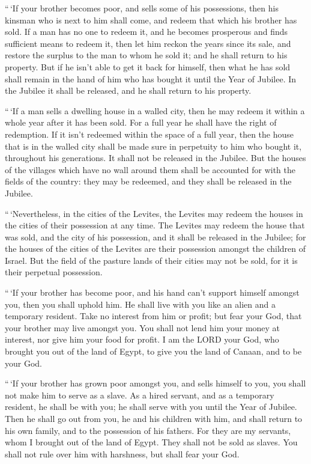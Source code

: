  ``\,`If your brother becomes poor, and sells some of his
possessions, then his kinsman who is next to him shall come, and redeem
that which his brother has sold.  If a man has no one to
redeem it, and he becomes prosperous and finds sufficient means to
redeem it,  then let him reckon the years since its sale,
and restore the surplus to the man to whom he sold it; and he shall
return to his property.  But if he isn't able to get it
back for himself, then what he has sold shall remain in the hand of him
who has bought it until the Year of Jubilee. In the Jubilee it shall be
released, and he shall return to his property.

 ``\,`If a man sells a dwelling house in a walled city,
then he may redeem it within a whole year after it has been sold. For a
full year he shall have the right of redemption.  If it
isn't redeemed within the space of a full year, then the house that is
in the walled city shall be made sure in perpetuity to him who bought
it, throughout his generations. It shall not be released in the Jubilee.
 But the houses of the villages which have no wall around
them shall be accounted for with the fields of the country: they may be
redeemed, and they shall be released in the Jubilee.

 ``\,`Nevertheless, in the cities of the Levites, the
Levites may redeem the houses in the cities of their possession at any
time.  The Levites may redeem the house that was sold, and
the city of his possession, and it shall be released in the Jubilee; for
the houses of the cities of the Levites are their possession amongst the
children of Israel.  But the field of the pasture lands of
their cities may not be sold, for it is their perpetual possession.

 ``\,`If your brother has become poor, and his hand can't
support himself amongst you, then you shall uphold him. He shall live
with you like an alien and a temporary resident.  Take no
interest from him or profit; but fear your God, that your brother may
live amongst you.  You shall not lend him your money at
interest, nor give him your food for profit.  I am the LORD
your God, who brought you out of the land of Egypt, to give you the land
of Canaan, and to be your God.

 ``\,`If your brother has grown poor amongst you, and sells
himself to you, you shall not make him to serve as a slave.
 As a hired servant, and as a temporary resident, he shall
be with you; he shall serve with you until the Year of Jubilee.
 Then he shall go out from you, he and his children with
him, and shall return to his own family, and to the possession of his
fathers.  For they are my servants, whom I brought out of
the land of Egypt. They shall not be sold as slaves.  You
shall not rule over him with harshness, but shall fear your God.

